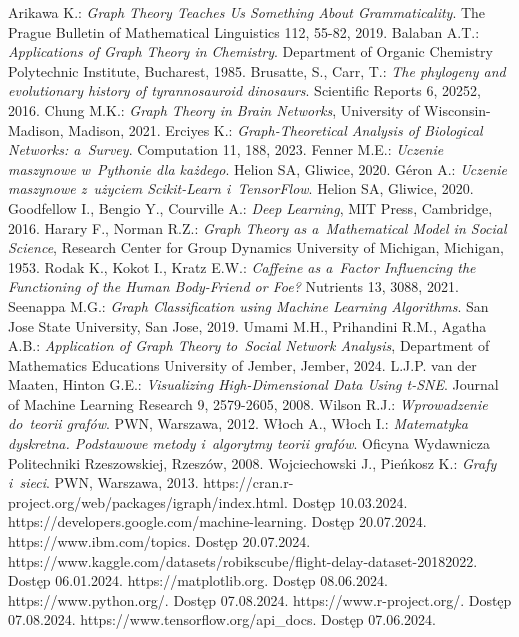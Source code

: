 
\begin{thebibliography}{4}
     Arikawa K.: \textit{Graph Theory Teaches Us Something About Grammaticality}. The Prague Bulletin of Mathematical Linguistics 112, 55-82, 2019.
     Balaban A.T.: \textit{Applications of Graph Theory in Chemistry}. Department of Organic Chemistry Polytechnic Institute, Bucharest, 1985.
     Brusatte, S., Carr, T.: \textit{The phylogeny and evolutionary history of tyrannosauroid dinosaurs}. Scientific Reports 6, 20252, 2016.
     Chung M.K.: \textit{Graph Theory in Brain Networks}, University of Wisconsin-Madison, Madison, 2021.
     Erciyes K.: \textit{Graph-Theoretical Analysis of Biological Networks: a~Survey}. Computation 11, 188, 2023.
     Fenner M.E.: \textit{Uczenie maszynowe w~Pythonie dla każdego}. Helion SA, Gliwice, 2020.
     Géron A.: \textit{Uczenie maszynowe z~użyciem Scikit-Learn i~TensorFlow}. Helion SA, Gliwice, 2020.
     Goodfellow I., Bengio Y., Courville A.: \textit{Deep Learning}, MIT Press, Cambridge, 2016.
     Harary F., Norman R.Z.: \textit{Graph Theory as a~Mathematical Model in Social Science}, Research Center for Group Dynamics University of Michigan, Michigan, 1953.
     Rodak K., Kokot I., Kratz E.W.: \textit{Caffeine as a~Factor Influencing the Functioning of the Human Body-Friend or Foe?} Nutrients 13, 3088, 2021.
     Seenappa M.G.: \textit{Graph Classification using Machine Learning Algorithms}. San Jose State University, San Jose, 2019.
     Umami M.H., Prihandini R.M., Agatha A.B.: \textit{Application of Graph Theory to~Social Network Analysis}, Department of Mathematics Educations University of Jember, Jember, 2024.
     L.J.P. van der Maaten, Hinton G.E.: \textit{Visualizing High-Dimensional Data Using t-SNE}. Journal of Machine Learning Research 9, 2579-2605, 2008.
     Wilson R.J.: \textit{Wprowadzenie do~teorii grafów}. PWN, Warszawa, 2012.
     Włoch A., Włoch I.: \textit{Matematyka dyskretna. Podstawowe metody i~algorytmy teorii grafów}. Oficyna Wydawnicza Politechniki Rzeszowskiej, Rzeszów, 2008.
     Wojciechowski J., Pieńkosz K.: \textit{Grafy i~sieci}. PWN, Warszawa, 2013.
     https://cran.r-project.org/web/packages/igraph/index.html. Dostęp 10.03.2024.
     https://developers.google.com/machine-learning. Dostęp 20.07.2024.
     https://www.ibm.com/topics. Dostęp 20.07.2024.
     https://www.kaggle.com/datasets/robikscube/flight-delay-dataset-20182022. Dostęp 06.01.2024.
     https://matplotlib.org. Dostęp 08.06.2024.
     https://www.python.org/. Dostęp 07.08.2024.
     https://www.r-project.org/. Dostęp 07.08.2024.
     https://www.tensorflow.org/api\_docs. Dostęp 07.06.2024.
\end{thebibliography}